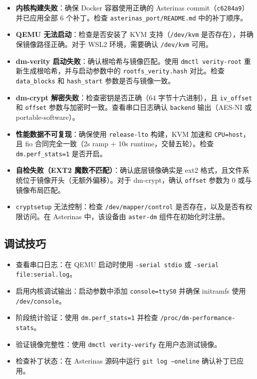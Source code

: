 \begin{itemize}
    \item \textbf{内核构建失败}：确保 Docker 容器使用正确的 Asterinas commit（\texttt{c6284a9}）并已应用全部 6 个补丁。检查 \texttt{asterinas\_\allowbreak port/\allowbreak README.md} 中的补丁顺序。

    \item \textbf{QEMU 无法启动}：检查是否安装了 KVM 支持（\texttt{/dev/\allowbreak kvm} 是否存在），并确保镜像路径正确。对于 WSL2 环境，需要确认 \texttt{/dev/\allowbreak kvm} 可用。

    \item \textbf{dm-verity 启动失败}：确认根哈希与镜像匹配。使用 \texttt{dmctl verity-\allowbreak root} 重新生成根哈希，并与启动参数中的 \texttt{rootfs\_\allowbreak verity.hash} 对比。检查 \texttt{data\_\allowbreak blocks} 和 \texttt{hash\_\allowbreak start} 参数是否与镜像一致。

    \item \textbf{dm-crypt 解密失败}：检查密钥是否正确（64 字节十六进制），且 \texttt{iv\_\allowbreak offset} 和 \texttt{offset} 参数与加密时一致。查看串口日志确认 \texttt{backend} 输出（AES-NI 或 portable-software）。

    \item \textbf{性能数据不可复现}：确保使用 \texttt{release-\allowbreak lto} 构建，KVM 加速和 \texttt{CPU=host}，且 fio 合同完全一致（2s ramp + 10s runtime，交替五轮）。检查 \texttt{dm.perf\_\allowbreak stats=1} 是否开启。

    \item \textbf{自检失败（EXT2 魔数不匹配）}：确认底层镜像确实是 ext2 格式，且文件系统位于镜像开头（无额外偏移）。对于 dm-crypt，确认 \texttt{offset} 参数为 0 或与镜像布局匹配。

    \item \texttt{cryptsetup} 无法控制：检查 \texttt{/dev/\allowbreak mapper/\allowbreak control} 是否存在，以及是否有权限访问。在 Asterinas 中，该设备由 \texttt{aster-\allowbreak dm} 组件在初始化时注册。
\end{itemize}

\subsection{调试技巧}

\begin{itemize}
    \item 查看串口日志：在 QEMU 启动时使用 \texttt{-serial stdio} 或 \texttt{-serial file:\allowbreak serial.log}。
    \item 启用内核调试输出：启动参数中添加 \texttt{console=\allowbreak ttyS0} 并确保 initramfs 使用 \texttt{/dev/\allowbreak console}。
    \item 阶段统计验证：使用 \texttt{dm.perf\_\allowbreak stats=1} 并检查 \texttt{/proc/\allowbreak dm-\allowbreak performance-\allowbreak stats}。
    \item 验证镜像完整性：使用 \texttt{dmctl verity-\allowbreak verify} 在用户态测试镜像。
    \item 检查补丁状态：在 Asterinas 源码中运行 \texttt{git log --oneline} 确认补丁已应用。
\end{itemize}

